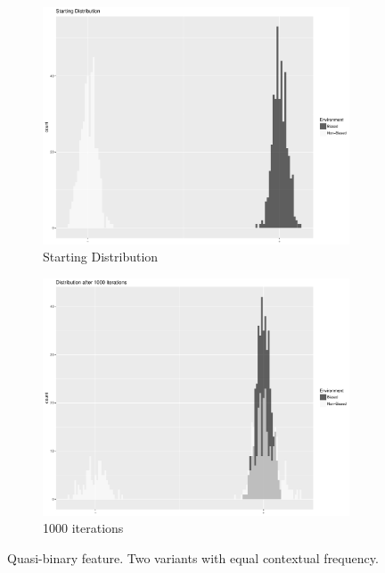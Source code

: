 \begin{figure}[H]

\begin{subfigure}[t]{.45\textwidth}
        \includegraphics[width=\linewidth]{figures/NasalizationStart.pdf}
        \caption{\label{fig:binary-Starting-Distribution}Starting Distribution}
    \end{subfigure}\hfill
    \begin{subfigure}[t]{.45\textwidth}
        \includegraphics[width=\linewidth]{figures/Nasalization1000iter.pdf}
        \caption{\label{fig:binary-1000iter}1000 iterations}
    \end{subfigure}
% 
% 

\caption{\label{fig:Context Mismatch Features}Quasi-binary feature. Two variants
with equal contextual frequency.}
\end{figure}
